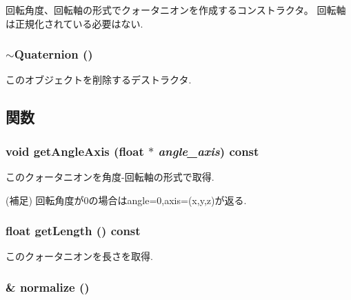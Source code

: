 回転角度、回転軸の形式でクォータニオンを作成するコンストラクタ。 回転軸は正規化されている必要はない. \hypertarget{classm3g_1_1Quaternion_6e9a147677b9ffd583c59e9d06c3d938}{
\subsubsection[{$\sim$Quaternion}]{\setlength{\rightskip}{0pt plus 5cm}$\sim${\bf Quaternion} ()}}
\label{classm3g_1_1Quaternion_6e9a147677b9ffd583c59e9d06c3d938}


このオブジェクトを削除するデストラクタ. 

\subsection{関数}
\hypertarget{classm3g_1_1Quaternion_3049675269aef6bb333d8f83fdf6eed7}{
\subsubsection[{getAngleAxis}]{\setlength{\rightskip}{0pt plus 5cm}void getAngleAxis (float $\ast$ {\em angle\_\-axis}) const}}
\label{classm3g_1_1Quaternion_3049675269aef6bb333d8f83fdf6eed7}


このクォータニオンを角度-回転軸の形式で取得.

(補足) 回転角度が0の場合はangle=0,axis=(x,y,z)が返る. \hypertarget{classm3g_1_1Quaternion_b4393f1928cea2a3baadbf9acdd99de2}{
\subsubsection[{getLength}]{\setlength{\rightskip}{0pt plus 5cm}float getLength () const}}
\label{classm3g_1_1Quaternion_b4393f1928cea2a3baadbf9acdd99de2}


このクォータニオンを長さを取得. \hypertarget{classm3g_1_1Quaternion_c9cc178bcc449e08499113c35feb2a2b}{
\subsubsection[{normalize}]{ \& normalize ()}}
\label{classm3g_1_1Quaternion_c9cc178bcc449e08499113c35feb2a2b}


